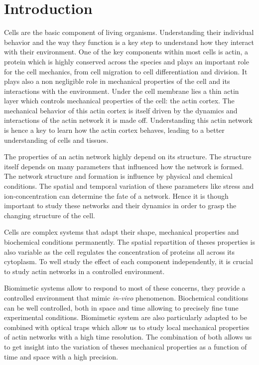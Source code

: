 \documentclass[A4paperpaper,11pt,english]{sphinxmanual}
\begin{document}
\section{Introduction}
\label{parts/part1:introduction}
Cells are the basic component of living organisms. Understanding their
individual behavior and the way they function is a key step to understand
how they interact with their environment. One of the key components within most
cells is actin, a protein which is highly conserved across the species and plays
an important role for the cell mechanics, from cell migration to cell differentiation
and division. It plays also a non negligible role in mechanical properties of
the cell and its interactions with the environment. Under the cell membrane lies a
thin actin layer which controls mechanical properties of the cell:
the actin cortex. The mechanical behavior of this actin cortex is itself driven
by the dynamics and interactions of the actin network  it is made off.
Understanding this actin network is hence a key to learn how the actin
cortex behaves, leading to a better understanding of cells and tissues.

The properties of an actin network highly depend on its structure. The
structure itself depends on many parameters that influenced how the network is
formed.  The network structure and formation is influence by physical and
chemical conditions. The spatial and temporal variation of these parameters like
stress and ion-concentration can determine the fate of a network. Hence it is though
important to study these networks and their dynamics in order to grasp the
changing structure of the cell.

Cells are complex systems that adapt their shape, mechanical properties and
biochemical conditions permanently. The spatial repartition of theses
properties is also variable as the cell regulates the concentration of proteins
all across its cytoplasm. To well study the effect of each component independently,
it is crucial to study actin networks in a controlled environment.

Biomimetic systems allow to respond to most of these concerns, they provide a
controlled environment that mimic \emph{in-vivo} phenomenon. Biochemical conditions
can be well controlled, both in space and time allowing to precisely fine tune
experimental conditions. Biomimetic system are also particularly adapted to be combined with
optical traps which allow us to study local mechanical properties of actin
networks with a high time resolution. The combination of both allows us to get
insight into the variation of theses mechanical properties as a function of
time and space with a high precision.
\end{document}
